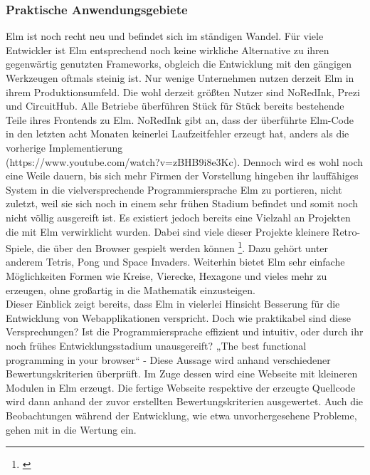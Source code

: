 \subsubsection{Praktische Anwendungsgebiete}
\label{sec:Praktische Anwendungsgebiete}
Elm ist noch recht neu und befindet sich im ständigen Wandel. Für viele Entwickler ist Elm entsprechend noch keine wirkliche Alternative zu ihren gegenwärtig genutzten Frameworks, obgleich die Entwicklung mit den gängigen Werkzeugen oftmals steinig ist. Nur wenige Unternehmen nutzen derzeit Elm in ihrem Produktionsumfeld. Die wohl derzeit größten Nutzer sind NoRedInk, Prezi und CircuitHub. Alle Betriebe überführen Stück für Stück bereits bestehende Teile ihres Frontends zu Elm. NoRedInk gibt an, dass der überführte Elm-Code in den letzten acht Monaten keinerlei Laufzeitfehler erzeugt hat, anders als die vorherige Implementierung\\ (https://www.youtube.com/watch?v=zBHB9i8e3Kc). Dennoch wird es wohl noch eine Weile dauern, bis sich mehr Firmen der Vorstellung hingeben ihr lauffähiges System in die vielversprechende Programmiersprache Elm zu portieren, nicht zuletzt, weil sie sich noch in einem sehr frühen Stadium befindet und somit noch nicht völlig ausgereift ist.
Es existiert jedoch bereits eine Vielzahl an Projekten die mit Elm verwirklicht wurden. Dabei sind viele dieser Projekte kleinere Retro-Spiele, die über den Browser gespielt werden können \footnote{\cite[vgl.]{builtwithelm}}. Dazu gehört unter anderem Tetris, Pong und Space Invaders. Weiterhin bietet Elm sehr einfache Möglichkeiten Formen wie Kreise, Vierecke, Hexagone und vieles mehr zu erzeugen, ohne großartig in die Mathematik einzusteigen.\\
Dieser Einblick zeigt bereits, dass Elm in vielerlei Hinsicht Besserung für die Entwicklung von Webapplikationen verspricht. Doch wie praktikabel sind diese Versprechungen? Ist die Programmiersprache effizient und intuitiv, oder durch ihr noch frühes Entwicklungsstadium unausgereift?
„The best functional programming in your browser“ - Diese Aussage wird anhand verschiedener Bewertungskriterien überprüft.
Im Zuge dessen wird eine Webseite mit kleineren Modulen in Elm erzeugt. Die fertige Webseite respektive der erzeugte Quellcode wird dann anhand der zuvor erstellten Bewertungskriterien ausgewertet. Auch die Beobachtungen während der Entwicklung, wie etwa unvorhergesehene Probleme, gehen mit in die Wertung ein.

